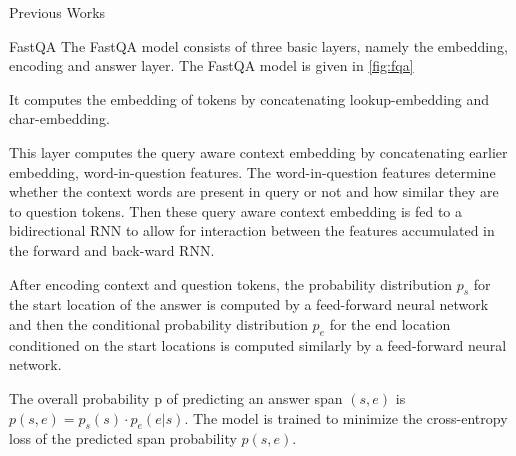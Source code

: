 \documentclass{article}
\begin{document}
\begin{psection}{Previous Works}



	\begin{psubsection}{FastQA}
		The FastQA \citep{fastqa} model consists of three basic layers, namely the embedding, encoding and answer layer. The FastQA model is given in \ref{fig:fqa}

		\begin{enumerate}
			 It computes the embedding of tokens by concatenating lookup-embedding and char-embedding.

			 This layer computes the query aware context embedding by concatenating earlier embedding, word-in-question features.
				The word-in-question features determine whether the context words are present in query or not and how similar they are to question tokens.
				Then these query aware context embedding is fed to a bidirectional RNN to allow for interaction between the features accumulated in the forward and back-ward RNN.

			 After encoding context and question tokens, the probability distribution $p_s$ for the start location of the answer is computed by a feed-forward neural network and then the conditional probability distribution $p_e$ for the end location conditioned on the start locations is computed similarly by a feed-forward neural network.

				The overall probability p of predicting an answer span $(s, e)$ is $p(s, e) = p_s(s) \cdot p_e (e|s)$.
				The model is trained to minimize the cross-entropy loss of the predicted span probability $p(s, e)$.
		\end{enumerate}


	\end{psubsection}


\end{psection}
\end{document}
